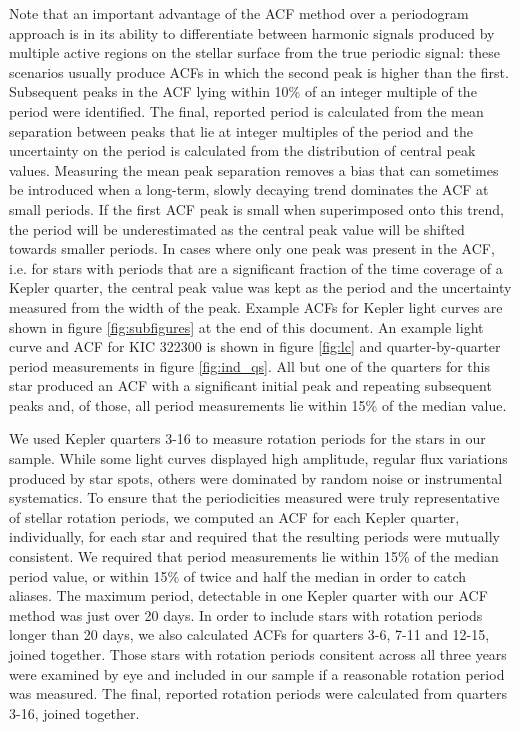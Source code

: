 \documentclass[10pt,preprint]{aastex}
\begin{document}
Note that an important advantage of the ACF method over a periodogram approach is in its ability to differentiate between harmonic signals produced by multiple active regions on the stellar surface from the true periodic signal: these scenarios usually produce ACFs in which the second peak is higher than the first.
Subsequent peaks in the ACF lying within 10\% of an integer multiple of the period were identified.
The final, reported period is calculated from the mean separation between peaks that lie at integer multiples of the period and the uncertainty on the period is calculated from the distribution of central peak values.
Measuring the mean peak separation removes a bias that can sometimes be introduced when a long-term, slowly decaying trend dominates the ACF at small periods.
If the first ACF peak is small when superimposed onto this trend, the period will be underestimated as the central peak value will be shifted towards smaller periods.
In cases where only one peak was present in the ACF, i.e. for stars with periods that are a significant fraction of the time coverage of a Kepler quarter, the central peak value was kept as the period and the uncertainty measured from the width of the peak.
Example ACFs for Kepler light curves are shown in figure \ref{fig:subfigures} at the end of this document.
An example light curve and ACF for KIC 322300 is shown in figure \ref{fig:lc} and quarter-by-quarter period measurements in figure \ref{fig:ind_qs}.
All but one of the quarters for this star produced an ACF with a significant initial peak and repeating subsequent peaks and, of those, all period measurements lie within 15\% of the median value.

We used Kepler quarters 3-16 to measure rotation periods for the stars in our sample.
While some light curves displayed high amplitude, regular flux variations produced by star spots, others were dominated by random noise or instrumental systematics.
To ensure that the periodicities measured were truly representative of stellar rotation periods, we computed an ACF for each Kepler quarter, individually, for each star and required that the resulting periods were mutually consistent.
We required that period measurements lie within 15\% of the median period value, or within 15\% of twice and half the median in order to catch aliases.
The maximum period, detectable in one Kepler quarter with our ACF method was just over 20 days.
In order to include stars with rotation periods longer than 20 days, we also calculated ACFs for quarters 3-6, 7-11 and 12-15, joined together.
Those stars with rotation periods consitent across all three years were examined by eye and included in our sample if a reasonable rotation period was measured.
The final, reported rotation periods were calculated from quarters 3-16, joined together.
\end{document}
